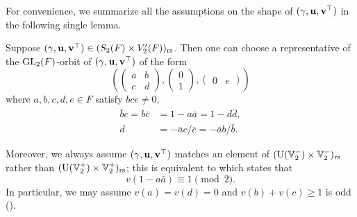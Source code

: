 For convenience, we summarize all the assumptions on the shape of ${(\gamma, \mathbf u, \mathbf v^\top)}$ in the following single lemma.
\begin{lemma}
  \label{lem:semi_lie_params}
  Suppose ${(\gamma, \mathbf u, \mathbf v^\top)} \in (S_2(F) \times V'_2(F))_{\mathrm{rs}}$.
  Then one can choose a representative of the $\operatorname{GL}_2(F)$-orbit of ${(\gamma, \mathbf u, \mathbf v^\top)}$ of the form
  \[
      \left( \begin{pmatrix} a & b \\ c & d \end{pmatrix},
      \begin{pmatrix} 0 \\ 1 \end{pmatrix}, \begin{pmatrix} 0 & e \end{pmatrix} \right)
  \]
  where $a,b,c,d,e \in F$ satisfy $bce \neq 0$,
  \begin{align*}
    \bar b c = b \bar c &= 1 - a \bar a = 1 - d \bar d, \\
    d &= - \bar a c / \bar c = -\bar a b / \bar b.
  \end{align*}

  Moreover, we always assume ${(\gamma, \mathbf u, \mathbf v^\top)}$ matches an element of
  $(\operatorname{U}(\mathbb V_2^-) \times \mathbb V_2^-)_{\mathrm{rs}}$
  rather than $(\operatorname{U}(\mathbb V_2^+) \times \mathbb V_2^+)_{\mathrm{rs}}$;
  this is equivalent to  which states that
  \[ v(1 - a \bar a) \equiv 1 \pmod 2. \]
  In particular, we may assume $v(a) = v(d) = 0$ and $v(b) + v(c) \ge 1$ is odd
  ().
\end{lemma}

